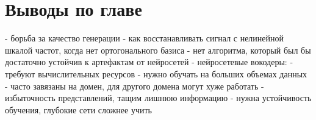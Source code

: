 \section{Выводы по главе}
\begin{markdown}
 - борьба за качество генерации
 - как восстанавливать сигнал с нелинейной шкалой частот, когда нет ортогонального базиса
 - нет алгоритма, который был бы достаточно устойчив к артефактам от нейросетей
 - нейросетевые вокодеры:
   - требуют вычислительных ресурсов
   - нужно обучать на больших объемах данных
   - часто завязаны на домен, для другого домена могут хуже работать
 - избыточность представлений, тащим лишнюю информацию
 - нужна устойчивость обучения, глубокие сети сложнее учить
\end{markdown}

